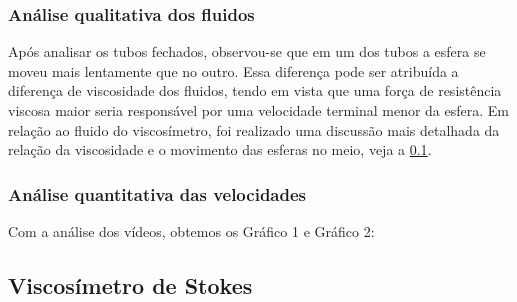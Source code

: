 \subsubsection{Análise qualitativa dos fluidos}
    Após analisar os tubos fechados, observou-se que em um dos tubos a esfera se
    moveu mais lentamente que no outro. Essa diferença pode ser atribuída a
    diferença de viscosidade dos fluidos, tendo em vista que uma força de
    resistência viscosa maior seria responsável por uma velocidade terminal
    menor da esfera. Em relação ao fluido do viscosímetro, foi realizado uma discussão mais
    detalhada da relação da viscosidade e o movimento das esferas no meio, veja
    a \cref{sec:viscStokes}.

\subsubsection{Análise quantitativa das velocidades}
    Com a análise dos vídeos, obtemos os Gráfico 1 e Gráfico 2:

\subsection{Viscosímetro de Stokes}\label{sec:viscStokes}

